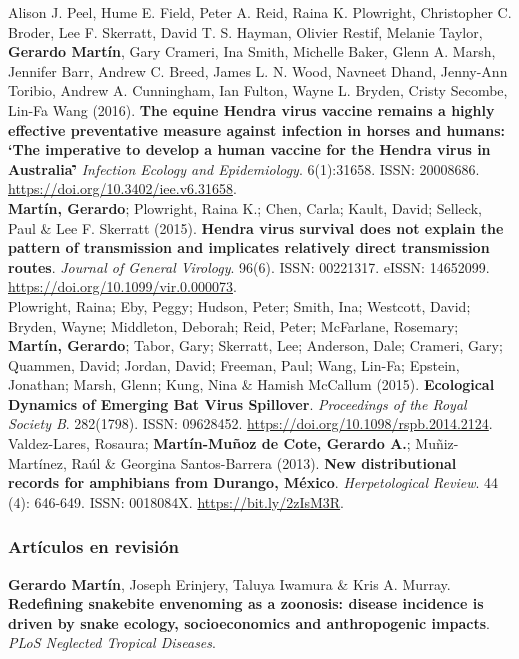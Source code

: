 \documentclass[11pt, letter]{article}
\newcommand{\years}[1]{\marginnote{\scriptsize #1}}
\begin{document}
\years{2016} Alison J. Peel, Hume E. Field, Peter A. Reid, Raina K. Plowright, Christopher C. Broder, Lee F. Skerratt, David T. S. Hayman, Olivier Restif, Melanie Taylor, \textbf{Gerardo Mart\'in}, Gary Crameri, Ina Smith, Michelle Baker, Glenn A. Marsh, Jennifer Barr, Andrew C. Breed, James L. N. Wood, Navneet Dhand, Jenny-Ann Toribio, Andrew A. Cunningham, Ian Fulton, Wayne L. Bryden, Cristy Secombe, Lin-Fa Wang (2016). \textbf{The equine Hendra virus vaccine remains a highly effective preventative measure against infection in horses and humans: \lq The imperative to develop a human vaccine for the Hendra virus in Australia\rq\.} \emph{Infection Ecology and Epidemiology}. 6(1):31658. ISSN: 20008686. \url{https://doi.org/10.3402/iee.v6.31658}.\\

\years{2015} \textbf{Mart\'in, Gerardo}; Plowright, Raina K.; Chen, Carla; Kault, David; Selleck, Paul \& Lee F. Skerratt (2015). \textbf{Hendra virus survival does not explain the pattern of transmission and implicates relatively direct transmission routes}. \emph{Journal of General Virology}. 96(6). ISSN: 00221317. eISSN: 14652099. \url{https://doi.org/10.1099/vir.0.000073}.\\

\years{2015} Plowright, Raina; Eby, Peggy; Hudson, Peter; Smith, Ina; Westcott, David; Bryden, Wayne; Middleton, Deborah; Reid, Peter; McFarlane, Rosemary; \textbf{Mart\'in, Gerardo}; Tabor, Gary; Skerratt, Lee; Anderson, Dale; Crameri, Gary; Quammen, David; Jordan, David; Freeman, Paul; Wang, Lin-Fa; Epstein, Jonathan; Marsh, Glenn; Kung, Nina \& Hamish McCallum (2015). \textbf{Ecological Dynamics of Emerging Bat Virus Spillover}. \emph{Proceedings of the Royal Society B}.  282(1798). ISSN: 09628452. \url{https://doi.org/10.1098/rspb.2014.2124}.\\

\years{2013} Valdez-Lares, Rosaura; \textbf{Mart\'in-Mu\~noz de Cote, Gerardo A.}; Mu\~niz-Mart\'inez, Ra\'ul \& Georgina Santos-Barrera (2013). \textbf{New distributional records for amphibians from Durango, M\'exico}. \emph{Herpetological Review}. 44 (4): 646-649. ISSN: 0018084X. \url{https://bit.ly/2zIsM3R}.\\

\subsubsection*{Art\'iculos en revisión}

\years{2021} \textbf{Gerardo Mart\'in}, Joseph Erinjery, Taluya Iwamura \& Kris A. Murray. \textbf{Redefining snakebite envenoming as a zoonosis: disease incidence is driven by snake ecology, socioeconomics and anthropogenic impacts}. \emph{PLoS Neglected Tropical Diseases}.
\end{document}
